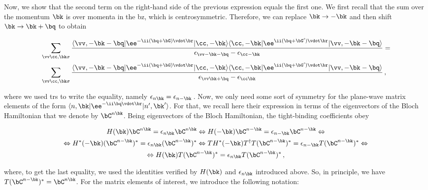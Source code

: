 \noindent Now, we show that the second term on the right-hand side of the previous expression equals the first one.
We first recall that the sum over the momentum $\bk$ is over momenta in the \gls{bz}, which is centrosymmetric.
Therefore, we can replace $\bk \to -\bk$ and then shift $\bk \to \bk + \bq$ to obtain

\begin{equation}
\begin{aligned}
    &\sum_{\vv \cc,\bk\sigma} \frac{\langle \vv,-\bk-\bq|\ee^{-\ii(\bq+\bG)\vdot\br}|\cc,-\bk\rangle \langle \cc,-\bk|\ee^{\ii(\bq+\bG')\vdot\br}|\vv,-\bk-\bq\rangle}{\epsilon_{\vv -\bk-\bq} - \epsilon_{\cc -\bk}} = \\
    & \sum_{\vv \cc,\bk\sigma} \frac{\langle \vv,-\bk-\bq|\ee^{-\ii(\bq+\bG)\vdot\br}|\cc,-\bk\rangle \langle \cc,-\bk|\ee^{\ii(\bq+\bG')\vdot\br}|\vv,-\bk-\bq\rangle}{\epsilon_{\vv \bk+\bq} - \epsilon_{\cc \bk}} \,,
\end{aligned}
\end{equation}

\noindent where we used \gls{trs} to write the equality, namely $\epsilon_{n  \bk} = \epsilon_{n - \bk}$\,.
Now, we only need some sort of symmetry for the plane-wave matrix elements of the form $\langle n,\bk|\ee^{-\ii\bq\vdot\br}|n',\bk'\rangle$.
For that, we recall here their expression in terms of the eigenvectors of the Bloch Hamiltonian that we denote by $\bC^{n \bk}$.
Being eigenvectors of the Bloch Hamiltonian, the tight-binding coefficients obey

\begin{equation}
\begin{gathered}
    H(\bk) \bC^{n \bk} = \epsilon_{n \bk} \bC^{n \bk} \Leftrightarrow H(-\bk) \bC^{n -\bk} = \epsilon_{n -\bk} \bC^{n -\bk} \Leftrightarrow \\
    \Leftrightarrow  H^*(-\bk) (\bC^{n -\bk})^* = \epsilon_{n \bk} (\bC^{n -\bk})^*  \Leftrightarrow T H^*(-\bk) T^{\dagger} T (\bC^{n -\bk})^* = \epsilon_{n -\bk} T(\bC^{n -\bk})^* \Leftrightarrow \\
    \Leftrightarrow  H(\bk) T (\bC^{n -\bk})^* = \epsilon_{n \bk} T(\bC^{n -\bk})^* \,,
\end{gathered} 
\end{equation}

\noindent where, to get the last equality, we used the identities verified by $H(\bk)$ and $\epsilon_{n \bk}$ introduced above.
So, in principle, we have $T (\bC^{n -\bk})^* = \bC^{n \bk}$.
For the matrix elements of interest, we introduce the following notation:

